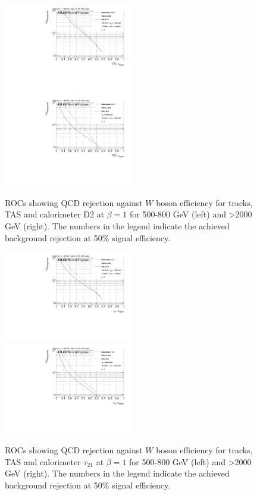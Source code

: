 \begin{figure}[htp]
\includegraphics[width=0.5\textwidth]{sascha_input/plots/W/beta1/ROC_ALL_h_recoJet_D2_bin2.pdf}
\includegraphics[width=0.5\textwidth]{sascha_input/plots/W/beta1/ROC_ALL_h_recoJet_D2_bin6.pdf}
\caption{\footnotesize{ROCs showing QCD rejection against $W$ boson efficiency for tracks, TAS and calorimeter D2 at $\beta=1$ for 500-800 GeV (left) and >2000 GeV (right). The numbers in the legend indicate the achieved background rejection at 50\% signal efficiency.}}\label{fig:ROC_W_D2}
\end{figure}

\begin{figure}[htp]
\includegraphics[width=0.5\textwidth]{sascha_input/plots/W/beta1/ROC_ALL_h_recoJet_nSub21_bin2.pdf}
\includegraphics[width=0.5\textwidth]{sascha_input/plots/W/beta1/ROC_ALL_h_recoJet_nSub21_bin6.pdf}
\caption{\footnotesize{ROCs showing QCD rejection against $W$ boson efficiency for tracks, TAS and calorimeter $\tau_{21}$ at $\beta=1$ for 500-800 GeV (left) and >2000 GeV (right). The numbers in the legend indicate the achieved background rejection at 50\% signal efficiency.}}\label{fig:ROC_W_nSub21}
\end{figure}


